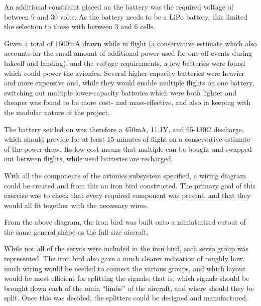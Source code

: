 \documentclass[../../main.tex]{subfiles}
\begin{document}
An additional constraint placed on the battery was the required voltage of between 9 and 30 volts.  As the battery needs to be a LiPo battery, this limited the selection to those with between 3 and 6 cells. 

Given a total of 1600mA drawn while in flight (a conservative estimate which also accounts for the small amount of additional power used for one-off events during takeoff and landing), and the voltage requirements, a few batteries were found which could power the avionics.
Several higher-capacity batteries were heavier and more expensive and, while they would enable multiple flights on one battery, switching out multiple lower-capacity batteries which were both lighter and cheaper was found to be more cost- and mass-effective, and also in keeping with the modular nature of the project. 

The battery settled on was therefore a 450mA, 11.1V, and 65-130C discharge, which should provide for at least 15 minutes of flight on a conservative estimate of the power draw.
Its low cost means that multiple can be bought and swapped out between flights, while used batteries are recharged. 

With all the components of the avionics subsystem specified, a wiring diagram could be created and from this an iron bird constructed.
The primary goal of this exercise was to check that every required component was present, and that they would all fit together with the necessary wires. 


From the above diagram, the iron bird was built onto a miniaturised cutout of the same general shape as the full-size aircraft. 


While not all of the servos were included in the iron bird, each servo group was represented.
The iron bird also gave a much clearer indication of roughly how much wiring would be needed to connect the various groups, and which layout would be most efficient for splitting the signals; that is, which signals should be brought down each of the main “limbs” of the aircraft, and where should they be split.
Once this was decided, the splitters could be designed and manufactured. 

\end{document}
